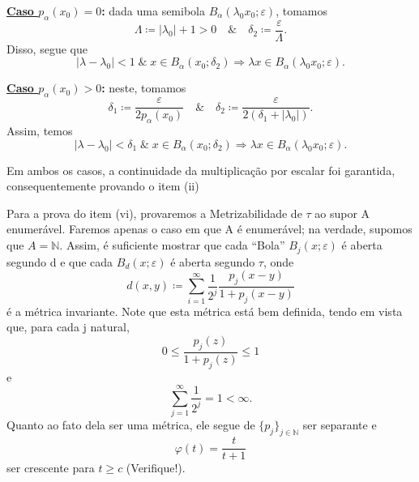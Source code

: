 \documentclass[../distribution_theory_notes.tex]{subfiles}
\begin{document}
\begin{proof*}
             \textbf{\underline{Caso \(p_{\alpha }(x_{0})=0\)}:} dada uma semibola \(B_{\alpha }(\lambda_{0}x_{0}; \varepsilon )\), tomamos 
               \[
                 \Lambda \coloneqq |\lambda_{0}| + 1 > 0 \quad\&\quad \delta_{2}\coloneqq \frac{\varepsilon }{\Lambda }.
               \]
               Disso, segue que 
                 \[
                   |\lambda -\lambda_{0}|<1\;\&\; x\in B_{\alpha }(x_{0}; \delta_{2}) \Rightarrow \lambda x\in B_{\alpha }(\lambda_{0}x_{0}; \varepsilon ).
                 \]

                 \textbf{\underline{Caso \(p_{\alpha }(x_{0})>0\)}:} neste, tomamos 
                   \[
                     \delta_1\coloneqq \frac{\varepsilon }{2p_{\alpha }(x_{0})} \quad\&\quad \delta_{2}\coloneqq \frac{\varepsilon }{2(\delta_{1}+|\lambda_{0}|)}.
                   \]
                   Assim, temos 
                     \[
                       |\lambda -\lambda_{0}|<\delta_1 \;\&\; x\in B_{\alpha }(x_{0}; \delta_{2})\Rightarrow \lambda x\in B_{\alpha }(\lambda_{0}x_{0}; \varepsilon ).
                     \]
                    
                     Em ambos os casos, a continuidade da multiplicação por escalar foi garantida, consequentemente provando o item (ii)

                     Para a prova do item (vi), provaremos a Metrizabilidade de \(\tau \) ao supor A enumerável. Faremos apenas o caso em que A é enumerável; na verdade, supomos que \(A=\mathbb{N}.\) Assim, é suficiente mostrar que cada ``Bola'' \(B_{j}(x; \varepsilon )\) é aberta segundo d e que cada \(B_{d}(x; \varepsilon )\) é aberta segundo \(\tau \), onde 
                       \[
                         d(x, y)\coloneqq \sum\limits_{i=1}^{\infty}\frac{1}{2^{j}}\frac{p_{j}(x-y)}{1+p_{j}(x-y)}
                       \]
                       é a métrica invariante. Note que esta métrica está bem definida, tendo em vista que, para cada j natural, 
                         \[
                           0\leq \frac{p_{j}(z)}{1+p_{j}(z)}\leq 1
                         \]
                         e 
                           \[
                             \sum\limits_{j=1}^{\infty}\frac{1}{2^{j}}=1<\infty.
                           \]
                           Quanto ao fato dela ser uma métrica, ele segue de \(\{p_{j}\}_{j\in \mathbb{N}}\) ser separante e 
                             \[
                               \varphi (t)=\frac{t}{t+1}
                             \]
                             ser crescente para \(t\geq c\) (Verifique!).


\end{proof*}
\end{document}
